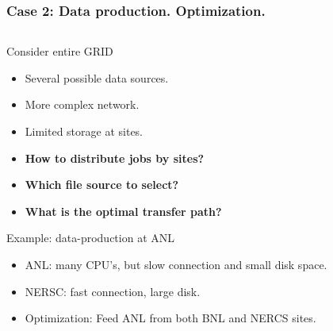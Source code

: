 \documentclass{beamer}
\begin{document}
\begin{frame}\frametitle{Case 2: Data production. Optimization. }
 	\begin{columns}[c] %
    \begin{footnotesize}
    \vspace{-20mm}
	\begin{block}{Consider entire GRID}	
		\begin{itemize}		
			\item Several possible data sources.
			\item More complex network.
			\item Limited storage at sites.
			\item \textbf{How to distribute jobs by sites?}
			\item \textbf{Which file source to select?}
			\item \textbf{What is the optimal transfer path?}

		\end{itemize}
 	\end{block}
		\begin{block}{Example: data-production at ANL  \cite{Balewski}}	
		\begin{itemize}
			\item ANL: many CPU's, but slow connection and small disk space.
			\item NERSC: fast connection, large disk.
			\item Optimization: Feed ANL from both BNL and NERCS sites.		


\end{itemize}
\end{block}
\end{footnotesize}
\end{columns}
\end{frame}
\end{document}
